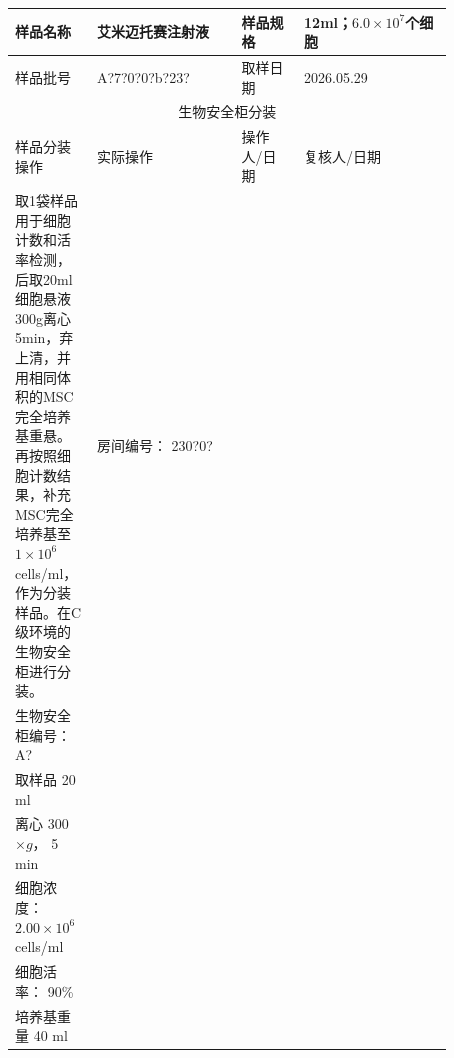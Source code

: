 \documentclass[UTF8,10pt,a4paper,fontset=fandol]{ctexart}
\newcommand{\fieldvalue}[1]{#1}
\newcommand{\handwritten}[1]{#1}
\begin{document}
\begin{tabular}{|p{0.13\linewidth}|p{0.30\linewidth}|p{0.13\linewidth}|p{0.31\linewidth}|}
\hline
样品名称 &
\fieldvalue{艾米迈托赛注射液} &
样品规格 &
\fieldvalue{12ml；$6.0\times10^{7}$个细胞}
\\ \hline
样品批号 &
\fieldvalue{\handwritten{A?7?0?0?b?23?}} &
取样日期 &
\fieldvalue{\handwritten{2026.05.29}}
\\ \hline
\multicolumn{4}{|c|}{生物安全柜分装} \\ \hline
\multicolumn{1}{|p{0.35\linewidth}|}{样品分装操作} &
\multicolumn{1}{p{0.30\linewidth}|}{实际操作} &
\multicolumn{1}{p{0.16\linewidth}|}{操作人/日期} &
\multicolumn{1}{p{0.16\linewidth}|}{复核人/日期}
\\ \hline
取1袋样品用于细胞计数和活率检测，后取20ml细胞悬液300g离心5min，弃上清，并用相同体积的MSC完全培养基重悬。再按照细胞计数结果，补充MSC完全培养基至$1\times10^{6}$ cells/ml，作为分装样品。在C级环境的生物安全柜进行分装。 &
房间编号：%
\fieldvalue{\handwritten{230?0?}}\\
生物安全柜编号：%
\fieldvalue{\handwritten{A?}}\\
取样品%
\fieldvalue{\handwritten{20}} ml\\
离心%
\fieldvalue{\handwritten{300}} $\times g$，%
\fieldvalue{\handwritten{5}} min\\
细胞浓度：%
\fieldvalue{\handwritten{$2.00\times10^{6}$ cells/ml}}\\
细胞活率：%
\fieldvalue{\handwritten{90\%}}\\
培养基重量%
\fieldvalue{\handwritten{40}} ml

\end{tabular}
\end{document}
